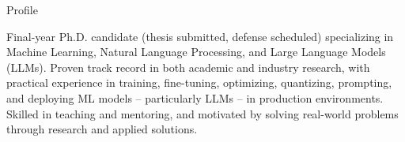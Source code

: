 


\begin{rubric}{Profile}
\begin{minipage}{\textwidth}
Final-year Ph.D. candidate (thesis submitted, defense scheduled) specializing in Machine Learning, Natural Language Processing, and Large Language Models (LLMs). Proven track record in both academic and industry research, with practical experience in training, fine-tuning, optimizing, quantizing, prompting, and deploying ML models -- particularly LLMs -- in production environments. Skilled in teaching and mentoring, and motivated by solving real-world problems through research and applied solutions.
\end{minipage}
\end{rubric}